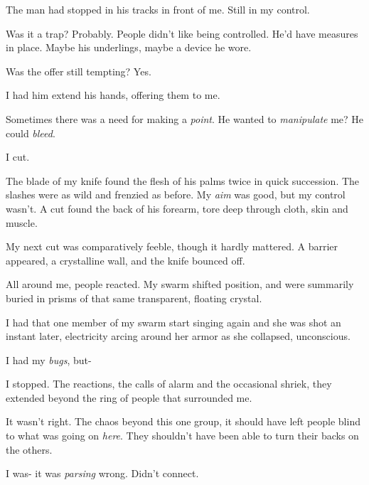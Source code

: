 The man had stopped in his tracks in front of me.  Still in my control.



Was it a trap?  Probably.  People didn't like being controlled.  He'd have measures in place.  Maybe his underlings, maybe a device he wore.



Was the offer still tempting?  Yes.



I had him extend his hands, offering them to me.



Sometimes there was a need for making a \emph{point}.  He wanted to \emph{manipulate} me?  He could \emph{bleed}.



I cut.



The blade of my knife found the flesh of his palms twice in quick succession.  The slashes were as wild and frenzied as before.  My \emph{aim} was good, but my control wasn't.  A cut found the back of his forearm, tore deep through cloth, skin and muscle.



My next cut was comparatively feeble, though it hardly mattered.  A barrier appeared, a crystalline wall, and the knife bounced off.



All around me, people reacted.  My swarm shifted position, and were summarily buried in prisms of that same transparent, floating crystal.



I had that one member of my swarm start singing again and she was shot an instant later, electricity arcing around her armor as she collapsed, unconscious.



I had my \emph{bugs}, but-



I stopped.  The reactions, the calls of alarm and the occasional shriek, they extended beyond the ring of people that surrounded me.



It wasn't right.  The chaos beyond this one group, it should have left people blind to what was going on \emph{here}.  They shouldn't have been able to turn their backs on the others.



I was- it was \emph{parsing} wrong.  Didn't connect.




